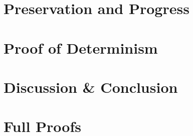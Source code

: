 \documentclass{kththesis}
\begin{document}



\chapter{Preservation and Progress}
\label{cha:preservation_and_progress}


\chapter{Proof of Determinism}
\label{cha:proof_of_determinism}


\chapter{Discussion \& Conclusion}
\label{cha:disc_concl}


\printbibliography[heading=bibintoc] %

\appendix

\chapter{Full Proofs}
\end{document}
